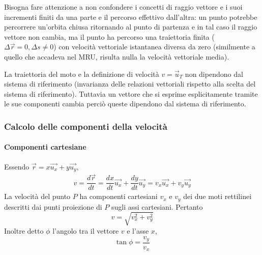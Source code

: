 \documentclass[class=book, crop=false, oneside, 12pt]{standalone}
\begin{document}
  Bisogna fare attenzione a non confondere i concetti di raggio vettore e i suoi incrementi finiti da una parte e il percorso effettivo dall'altra: un punto potrebbe percorrere un'orbita chiusa ritornando al punto di partenza e in tal caso il raggio vettore non cambia, ma il punto ha percorso una traiettoria finita (\(\Delta \overrightarrow{r} = 0, \Delta s \neq 0\)) con velocità vettoriale istantanea diversa da zero (similmente a quello che accadeva nel MRU, risulta nulla la velocità vettoriale media).

  La traiettoria del moto e la definizione di velocità \(v = \overrightarrow{u}_T\) non dipendono dal sistema di riferimento (invarianza delle relazioni vettoriali rispetto alla scelta del sistema di riferimento).
  Tuttavia un vettore che si esprime esplicitamente tramite le sue componenti cambia perciò queste dipendono dal sistema di riferimento.
		\subsubsection{Calcolo delle componenti della velocit\`a}
			\paragraph{Componenti cartesiane}
      Essendo $\overrightarrow{r}=x\overrightarrow{u_x}+y\overrightarrow{u_y}$,
			\begin{align*}
        v =\dfrac{d\overrightarrow{r}}{dt}
          =\dfrac{dx}{dt}\overrightarrow{u_x}+\dfrac{dy}{dt}\overrightarrow{u_y}
          =v_x\overrightarrow{u_x} + v_y\overrightarrow{u_y}
			\end{align*}
			La velocit\`a del punto $P$ ha componenti cartesiani $v_x$ e $v_y$ dei due moti rettilinei descritti dai punti proiezione di $P$ sugli assi cartesiani.
			Pertanto
			$$v=\sqrt{v^2_x+v_y^2}$$
			Inoltre detto $\phi$ l'angolo tra il vettore $v$ e l'asse $x$,
			$$\tan\phi = \dfrac{v_y}{v_x}$$
\end{document}
